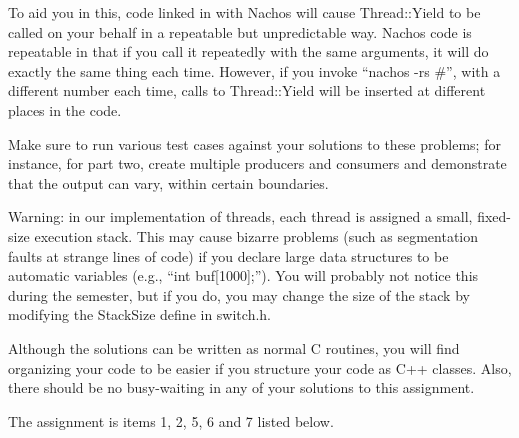 To aid you in this, code linked in with Nachos will cause Thread::Yield
to be called on your behalf in a repeatable but unpredictable way.
Nachos code is repeatable in that if you call it repeatedly with the
same arguments, it will do exactly the same thing each time.
However, if you invoke ``nachos -rs \#'', with a different number each
time, calls to Thread::Yield will be inserted at different places in the code.

Make sure to run various test cases against your solutions to
these problems; for instance, for part two, create multiple producers
and consumers and demonstrate that the output can vary, within certain
boundaries.

Warning: in our implementation of threads, each thread is assigned a
small, fixed-size execution stack.  This may cause bizarre problems
(such as segmentation faults at strange lines of code) if you declare
large data structures to be automatic variables (e.g., ``int buf[1000];'').
You will probably not notice this during the semester, but if you do,
you may change the size of the stack by modifying the StackSize define in
switch.h.

Although the solutions can be written as normal C routines, you will
find organizing your code to be easier if you structure your code
as C++ classes.  Also, there should be no busy-waiting in any of your
solutions to this assignment.

The assignment is items 1, 2, 5, 6 and 7 listed below.

